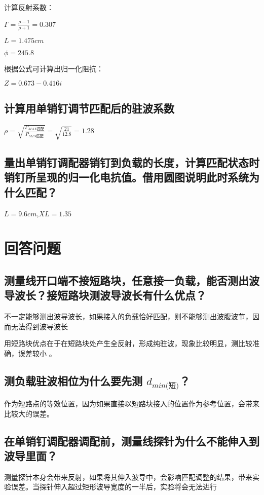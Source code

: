 \documentclass{../source/zjureport}
\begin{document}
        计算反射系数：

        $\Gamma = \frac{\rho - 1}{\rho + 1} = 0.307$

        $L = 1.475cm$

        $\phi = 245.8$

        根据公式可计算出归一化阻抗：

        $Z=0.673-0.416i$

        \subsection{计算用单销钉调节匹配后的驻波系数}
        $\rho = \sqrt{\frac{P_{MAX\text{匹配}}}{P_{MIN\text{匹配}}}} = \sqrt{\frac{21}{12.8}} = 1.28$

        \subsection{量出单销钉调配器销钉到负载的长度，计算匹配状态时销钉所呈现的归一化电抗值。借用圆图说明此时系统为什么匹配？}
        $L = 9.6cm$,$XL = 1.35$

    \section{回答问题}
        \subsection{测量线开口端不接短路块，任意接一负载，能否测出波导波长？接短路块测波导波长有什么优点？}
        不一定能够测出波导波长，如果接入的负载恰好匹配，则不能够测出波腹波节，因而无法得到波导波长

        用短路块优点在于在短路块处产生全反射，形成纯驻波，现象比较明显，测比较准确，误差较小 。

        \subsection{测负载驻波相位为什么要先测 $d_{min\text{(短)}}$？}
        作为短路点的等效位置，因为如果直接以短路块接入的位置作为参考位置，会带来比较大的误差。

        \subsection{在单销钉调配器调配前，测量线探针为什么不能伸入到波导里面？}
        测量探针本身会带来反射，如果将其伸入波导中，会影响匹配调整的结果，带来实验误差。当探针伸入超过矩形波导宽度的一半后，实验将会无法进行
\end{document}

